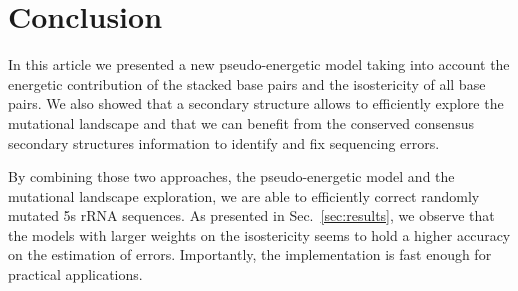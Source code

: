\section{Conclusion}
\label{sec:conclusion}

In this article we presented a new 
 pseudo-energetic model taking into account the energetic contribution 
of the stacked base pairs and the isostericity of all base pairs. 
We also showed that a secondary structure allows to efficiently
explore the mutational landscape and that we can benefit from the
 conserved consensus secondary structures  information
to identify and fix sequencing errors.


By combining those two approaches, the pseudo-energetic model and the 
mutational landscape exploration, we are able  to efficiently 
correct randomly mutated 5s rRNA sequences. 
As presented in Sec.~\ref{sec:results},
we observe that the models
with larger weights on the
isostericity seems to hold a higher accuracy on the estimation of errors.
Importantly, the implementation is fast enough for practical applications.